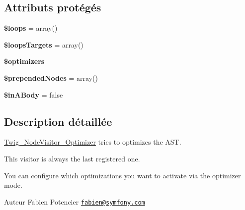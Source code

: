 \subsection*{Attributs protégés}
\begin{DoxyCompactItemize}
\item 
{\bfseries \$loops} = array()\hypertarget{class_twig___node_visitor___optimizer_a4475ac4b73ac6fe6c253c60daa0dcabe}{}\label{class_twig___node_visitor___optimizer_a4475ac4b73ac6fe6c253c60daa0dcabe}

\item 
{\bfseries \$loops\+Targets} = array()\hypertarget{class_twig___node_visitor___optimizer_a89a2bf1b64fd297eed4f6668434d0a04}{}\label{class_twig___node_visitor___optimizer_a89a2bf1b64fd297eed4f6668434d0a04}

\item 
{\bfseries \$optimizers}\hypertarget{class_twig___node_visitor___optimizer_ac72228b8f9868fc4880a13d6d823d754}{}\label{class_twig___node_visitor___optimizer_ac72228b8f9868fc4880a13d6d823d754}

\item 
{\bfseries \$prepended\+Nodes} = array()\hypertarget{class_twig___node_visitor___optimizer_a27139da69e6a15c23d660200a0d3d229}{}\label{class_twig___node_visitor___optimizer_a27139da69e6a15c23d660200a0d3d229}

\item 
{\bfseries \$in\+A\+Body} = false\hypertarget{class_twig___node_visitor___optimizer_a046ca599771071b1cb50fe02f7312b9c}{}\label{class_twig___node_visitor___optimizer_a046ca599771071b1cb50fe02f7312b9c}

\end{DoxyCompactItemize}


\subsection{Description détaillée}
\hyperlink{class_twig___node_visitor___optimizer}{Twig\+\_\+\+Node\+Visitor\+\_\+\+Optimizer} tries to optimizes the A\+ST.

This visitor is always the last registered one.

You can configure which optimizations you want to activate via the optimizer mode.

\begin{DoxyAuthor}{Auteur}
Fabien Potencier \href{mailto:fabien@symfony.com}{\tt fabien@symfony.\+com} 
\end{DoxyAuthor}


